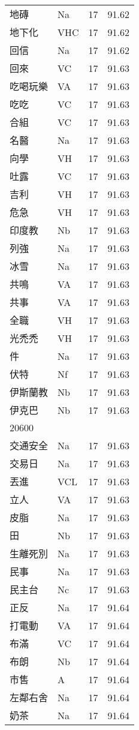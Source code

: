 \documentclass[twocolumn]{book}
\begin{document}
\begin{supertabular}{llrr}
地磚 & Na & 17 &  91.62\\
地下化 & VHC & 17 &  91.62\\
回信 & Na & 17 &  91.62\\
回來 & VC & 17 &  91.63\\
吃喝玩樂 & VA & 17 &  91.63\\
吃吃 & VC & 17 &  91.63\\
合組 & VC & 17 &  91.63\\
名醫 & Na & 17 &  91.63\\
向學 & VH & 17 &  91.63\\
吐露 & VC & 17 &  91.63\\
吉利 & VH & 17 &  91.63\\
危急 & VH & 17 &  91.63\\
印度教 & Nb & 17 &  91.63\\
列強 & Na & 17 &  91.63\\
冰雪 & Na & 17 &  91.63\\
共鳴 & VA & 17 &  91.63\\
共事 & VA & 17 &  91.63\\
全職 & VH & 17 &  91.63\\
光禿禿 & VH & 17 &  91.63\\
件 & Na & 17 &  91.63\\
伏特 & Nf & 17 &  91.63\\
伊斯蘭教 & Nb & 17 &  91.63\\
伊克巴 & Nb & 17 &  91.63\\
20600\\
交通安全 & Na & 17 &  91.63\\
交易日 & Na & 17 &  91.63\\
丟進 & VCL & 17 &  91.63\\
立人 & VA & 17 &  91.63\\
皮脂 & Na & 17 &  91.63\\
田 & Nb & 17 &  91.63\\
生離死別 & Na & 17 &  91.63\\
民事 & Na & 17 &  91.63\\
民主台 & Nc & 17 &  91.63\\
正反 & Na & 17 &  91.64\\
打電動 & VA & 17 &  91.64\\
布滿 & VC & 17 &  91.64\\
布朗 & Nb & 17 &  91.64\\
市售 & A & 17 &  91.64\\
左鄰右舍 & Na & 17 &  91.64\\
奶茶 & Na & 17 &  91.64\\

\end{supertabular}
\end{document}
